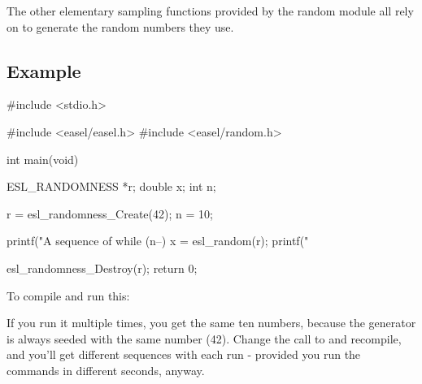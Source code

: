 The other elementary sampling functions provided by the random module
all rely on  to generate the random numbers they
use.


\subsection{Example}

\begin{cchunk}
#include <stdio.h>

#include <easel/easel.h>
#include <easel/random.h>

int 
main(void)
{
  ESL_RANDOMNESS *r;
  double          x;
  int             n;
  
  r = esl_randomness_Create(42); 
  n = 10;

  printf("A sequence of %
  while (n--) {
    x = esl_random(r);
    printf("%
  }

  esl_randomness_Destroy(r);
  return 0;
}
\end{cchunk}

To compile and run this:
\begin{cchunk}
\end{cchunk}

If you run it multiple times, you get the same ten numbers, because
the generator is always seeded with the same number (42). Change the
 call to
 and recompile, and you'll
get different sequences with each run - provided you run the commands
in different seconds, anyway.






